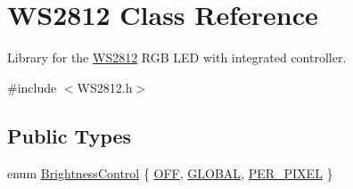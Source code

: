\hypertarget{class_w_s2812}{}\section{W\+S2812 Class Reference}
\label{class_w_s2812}


Library for the \hyperlink{class_w_s2812}{W\+S2812} R\+GB L\+ED with integrated controller.  




{\ttfamily \#include $<$W\+S2812.\+h$>$}

\subsection*{Public Types}
\begin{DoxyCompactItemize}
\item 
enum \hyperlink{class_w_s2812_a14186f70863bf4f3a35b2cc21b15642d}{Brightness\+Control} \{ \hyperlink{class_w_s2812_a14186f70863bf4f3a35b2cc21b15642da3937d959838b5887619b403a2f717d55}{O\+FF}, 
\hyperlink{class_w_s2812_a14186f70863bf4f3a35b2cc21b15642daa7deeb0d0cec915ba197b48ca887ed45}{G\+L\+O\+B\+AL}, 
\hyperlink{class_w_s2812_a14186f70863bf4f3a35b2cc21b15642dad5ae572eb876f9e90650fd6817385863}{P\+E\+R\+\_\+\+P\+I\+X\+EL}
 \}
\end{DoxyCompactItemize}
